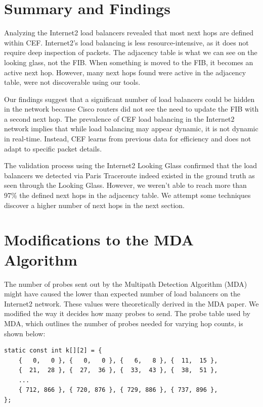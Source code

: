 \documentclass[12pt]{cwru_thesis}
\begin{document}
\section{Summary and Findings}

Analyzing the Internet2 load balancers revealed that most next hops are defined within CEF. Internet2's load balancing is less resource-intensive, as it does not require deep inspection of packets. The adjacency table is what we can see on the looking glass, not the FIB. When something is moved to the FIB, it becomes an active next hop. However, many next hops found were active in the adjacency table, were not discoverable using our tools.

Our findings suggest that a significant number of load balancers could be hidden in the network because Cisco routers did not see the need to update the FIB with a second next hop. The prevalence of CEF load balancing in the Internet2 network implies that while load balancing may appear dynamic, it is not dynamic in real-time. Instead, CEF learns from previous data for efficiency and does not adapt to specific packet details.

The validation process using the Internet2 Looking Glass confirmed that the load balancers we detected via Paris Traceroute indeed existed in the ground truth as seen through the Looking Glass. However, we weren't able to reach more than 97\% the defined next hops in the adjacency table. We attempt some techniques discover a higher number of next hops in the next section. 


\section{Modifications to the MDA Algorithm}

The number of probes sent out by the Multipath Detection Algorithm (MDA) might have caused the lower than expected number of load balancers on the Internet2 network. These values were theoretically derived in the MDA paper. We modified the way it decides how many probes to send. The probe table used by MDA, which outlines the number of probes needed for varying hop counts, is shown below:

\begin{verbatim}
static const int k[][2] = {
    {   0,   0 }, {   0,   0 }, {   6,   8 }, {  11,  15 },
    {  21,  28 }, {  27,  36 }, {  33,  43 }, {  38,  51 }, 
    ...
    { 712, 866 }, { 720, 876 }, { 729, 886 }, { 737, 896 }, 
};
\end{verbatim}
\end{document}
